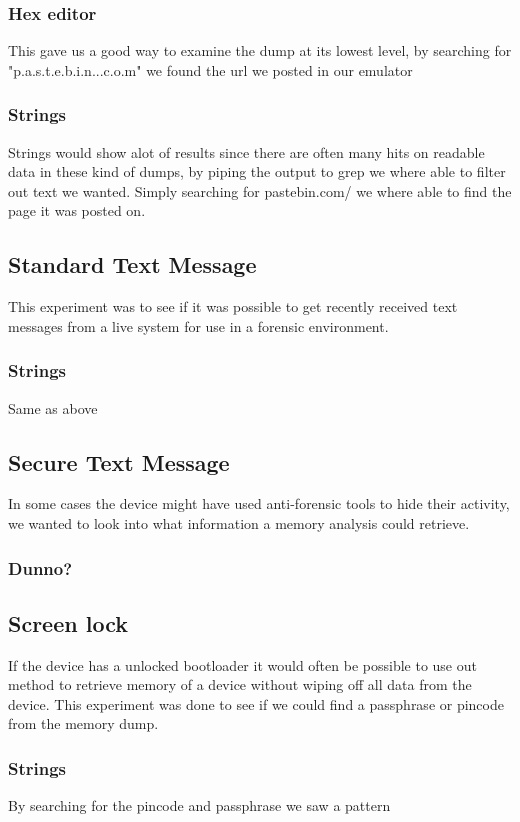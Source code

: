   \subsubsection{Hex editor}
  This gave us a good way to examine the dump at its lowest level, by searching for 
  "p.a.s.t.e.b.i.n...c.o.m" we found the url we posted in our emulator

  \subsubsection{Strings}
  Strings would show alot of results since there are often many hits on readable 
  data in these kind of dumps, by piping the output to grep we where able to 
  filter out text we wanted. Simply searching for pastebin.com/ we where able to 
  find the page it was posted on. 

\subsection{Standard Text Message}
This experiment was to see if it was possible to get recently received text 
messages from a live system for use in a forensic environment.

  \subsubsection{Strings}
  Same as above %

\subsection{Secure Text Message}
In some cases the device might have used anti-forensic tools to hide their 
activity, we wanted to look into what information a memory analysis could 
retrieve.

\subsubsection{Dunno?}

\subsection{Screen lock}
If the device has a unlocked bootloader it would often be possible to use out 
method to retrieve memory of a device without wiping off all data from the 
device. This experiment was done to see if we could find a passphrase or 
pincode from the memory dump.

  \subsubsection{Strings}
  By searching for the pincode and passphrase we saw a pattern 

